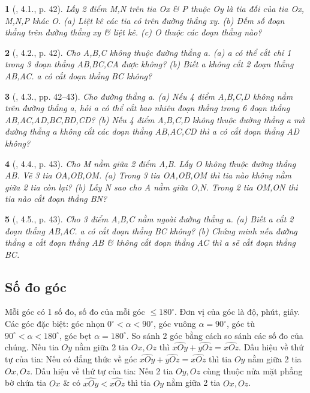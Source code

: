 \documentclass{article}
\newtheorem{baitoan}{}
\begin{document}
\begin{baitoan}[\cite{TLCT_THCS_Toan_6_hinh_hoc}, 4.1., p. 42]
	Lấy 2 điểm M,N trên tia Ox \& P thuộc Oy là tia đối của tia Ox, M,N,P khác O. (a) Liệt kê các tia có trên đường thẳng xy. (b) Đếm số đoạn thẳng trên đường thẳng xy \& liệt kê. (c) O thuộc các đoạn thẳng nào?
\end{baitoan}

\begin{baitoan}[\cite{TLCT_THCS_Toan_6_hinh_hoc}, 4.2., p. 42]
	Cho A,B,C không thuộc đường thẳng a. (a) a có thể cắt chỉ 1 trong 3 đoạn thẳng AB,BC,CA được không? (b) Biết a không cắt 2 đoạn thẳng AB,AC. a có cắt đoạn thẳng BC không?
\end{baitoan}

\begin{baitoan}[\cite{TLCT_THCS_Toan_6_hinh_hoc}, 4.3., pp. 42--43]
	Cho đường thẳng a. (a) Nếu 4 điểm A,B,C,D không nằm trên đường thẳng a, hỏi a có thể cắt bao nhiêu đoạn thẳng trong 6 đoạn thẳng AB,AC,AD,BC,BD,CD? (b) Nếu 4 điểm A,B,C,D không thuộc đường thẳng a mà đường thẳng a không cắt các đoạn thẳng AB,AC,CD thì a có cắt đoạn thẳng AD không?
\end{baitoan}

\begin{baitoan}[\cite{TLCT_THCS_Toan_6_hinh_hoc}, 4.4., p. 43]
	Cho M nằm giữa 2 điểm A,B. Lấy O không thuộc đường thẳng AB. Vẽ 3 tia OA,OB,OM. (a) Trong 3 tia OA,OB,OM thì tia nào không nằm giữa 2 tia còn lại? (b) Lấy N sao cho A nằm giữa O,N. Trong 2 tia OM,ON thì tia nào cắt đoạn thẳng BN?
\end{baitoan}

\begin{baitoan}[\cite{TLCT_THCS_Toan_6_hinh_hoc}, 4.5., p. 43]
	Cho 3 điểm A,B,C nằm ngoài đường thẳng a. (a) Biết a cắt 2 đoạn thẳng AB,AC. a có cắt đoạn thẳng BC không? (b) Chứng minh nếu đường thẳng a cắt đoạn thẳng AB \& không cắt đoạn thẳng AC thì a sẽ cắt đoạn thẳng BC.
\end{baitoan}


\subsection{Số đo góc}
 Mỗi góc có 1 số đo, số đo của mỗi góc $\le180^\circ$. Đơn vị của góc là độ, phút, giây. Các góc đặc biệt: góc nhọn $0^\circ < \alpha < 90^\circ$, góc vuông $\alpha = 90^\circ$, góc tù $90^\circ < \alpha < 180^\circ$, góc bẹt $\alpha = 180^\circ$.  So sánh 2 góc bằng cách so sánh các số đo của chúng.  Nếu tia $Oy$ nằm giữa 2 tia $Ox,Oz$ thì $\widehat{xOy} + \widehat{yOz} = \widehat{xOz}$.  {\sf Dấu hiệu về thứ tự của tia}: Nếu có đẳng thức về góc $\widehat{xOy} + \widehat{yOz} = \widehat{xOz}$ thì tia $Oy$ nằm giữa 2 tia $Ox,Oz$.  {\sf Dấu hiệu về thứ tự của tia}: Nếu 2 tia $Oy,Oz$ cùng thuộc nửa mặt phẳng bờ chứa tia $Ox$ \& có $\widehat{xOy} < \widehat{xOz}$ thì tia $Oy$ nằm giữa 2 tia $Ox,Oz$.
\end{document}
